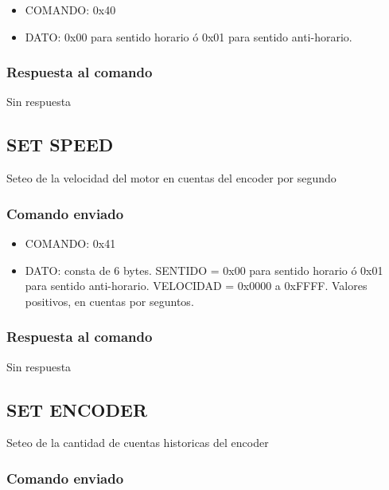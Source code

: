 \documentclass[a4paper,11pt]{article}
\begin{document}
\begin{itemize}
	\item{COMANDO:} 0x40
	\item{DATO:} 0x00 para sentido horario \'o 0x01 para sentido anti-horario.
\end{itemize}

\subsubsection*{Respuesta al comando}
\label{direction_respuesta}

Sin respuesta

\subsection{SET SPEED}
\label{set_speed}

Seteo de la velocidad del motor en cuentas del encoder por segundo

\subsubsection*{Comando enviado}
\label{set_speed_comando_enviado}

\begin{itemize}
	\item{COMANDO:} 0x41
	\item{DATO:} consta de 6 bytes.
		SENTIDO = 0x00 para sentido horario \'o 0x01 para sentido anti-horario.
		VELOCIDAD = 0x0000 a 0xFFFF. Valores positivos, en cuentas por seguntos.
\end{itemize}

\subsubsection*{Respuesta al comando}
\label{set_speed_respuesta}

Sin respuesta

\subsection{SET ENCODER}
\label{set_encoder}

Seteo de la cantidad de cuentas historicas del encoder

\subsubsection*{Comando enviado}
\label{set_encoder_comando_enviado}
\end{document}

